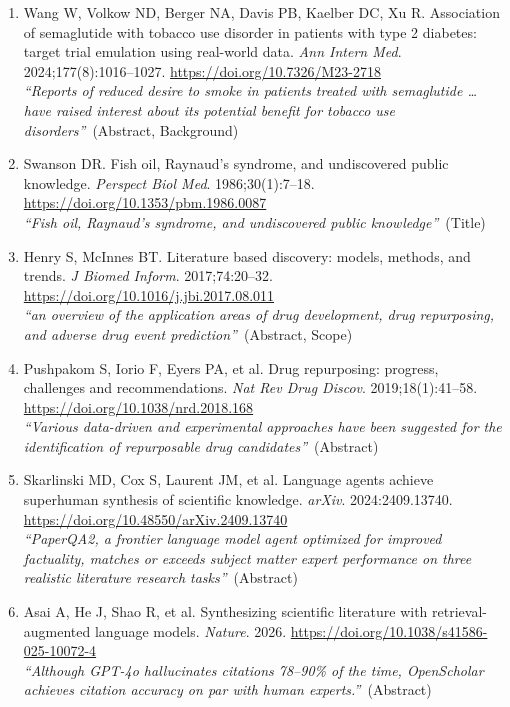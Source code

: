 \documentclass[12pt]{article}
\begin{document}
{\begin{enumerate}[leftmargin=1.8em,itemsep=5pt,topsep=0pt,label=\arabic*.]
\item \hypertarget{ref-wang2024}{}Wang W, Volkow ND, Berger NA, Davis PB, Kaelber DC, Xu R. Association of semaglutide with tobacco use disorder in patients with type 2 diabetes: target trial emulation using real-world data. \textit{Ann Intern Med}. 2024;177(8):1016--1027. \url{https://doi.org/10.7326/M23-2718}\\[1pt]{\color{quote}\itshape ``Reports of reduced desire to smoke in patients treated with semaglutide \ldots{} have raised interest about its potential benefit for tobacco use disorders''}~{\color{quote}\footnotesize(Abstract, Background)}
\item \hypertarget{ref-swanson1986}{}Swanson DR. Fish oil, Raynaud's syndrome, and undiscovered public knowledge. \textit{Perspect Biol Med}. 1986;30(1):7--18. \url{https://doi.org/10.1353/pbm.1986.0087}\\[1pt]{\color{quote}\itshape ``Fish oil, Raynaud's syndrome, and undiscovered public knowledge''}~{\color{quote}\footnotesize(Title)}
\item \hypertarget{ref-henry2017}{}Henry S, McInnes BT. Literature based discovery: models, methods, and trends. \textit{J Biomed Inform}. 2017;74:20--32. \url{https://doi.org/10.1016/j.jbi.2017.08.011}\\[1pt]{\color{quote}\itshape ``an overview of the application areas of drug development, drug repurposing, and adverse drug event prediction''}~{\color{quote}\footnotesize(Abstract, Scope)}
\item \hypertarget{ref-pushpakom2019}{}Pushpakom S, Iorio F, Eyers PA, et al. Drug repurposing: progress, challenges and recommendations. \textit{Nat Rev Drug Discov}. 2019;18(1):41--58. \url{https://doi.org/10.1038/nrd.2018.168}\\[1pt]{\color{quote}\itshape ``Various data-driven and experimental approaches have been suggested for the identification of repurposable drug candidates''}~{\color{quote}\footnotesize(Abstract)}
\item \hypertarget{ref-skarlinski2024}{}Skarlinski MD, Cox S, Laurent JM, et al. Language agents achieve superhuman synthesis of scientific knowledge. \textit{arXiv}. 2024:2409.13740. \url{https://doi.org/10.48550/arXiv.2409.13740}\\[1pt]{\color{quote}\itshape ``PaperQA2, a frontier language model agent optimized for improved factuality, matches or exceeds subject matter expert performance on three realistic literature research tasks''}~{\color{quote}\footnotesize(Abstract)}
\item \hypertarget{ref-asai2026}{}Asai A, He J, Shao R, et al. Synthesizing scientific literature with retrieval-augmented language models. \textit{Nature}. 2026. \url{https://doi.org/10.1038/s41586-025-10072-4}\\[1pt]{\color{quote}\itshape ``Although GPT-4o hallucinates citations 78--90\% of the time, OpenScholar achieves citation accuracy on par with human experts.''}~{\color{quote}\footnotesize(Abstract)}
\end{enumerate}
}
\end{document}
